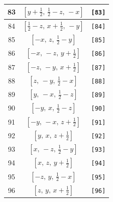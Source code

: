 \documentclass[fleqn,8pt]{jsarticle}
\begin{document}
\begin{longtable}{ccc}
83 & $\left[ y + \frac{1}{2},\, \frac{1}{2} - z,\, - x \right]$ & {\tt [83]} \\ \hline
84 & $\left[ \frac{1}{2} - z,\, x + \frac{1}{2},\, - y \right]$ & {\tt [84]} \\ \hline
85 & $\left[ - x,\, z,\, \frac{1}{2} - y \right]$ & {\tt [85]} \\ \hline
86 & $\left[ - x,\, - z,\, y + \frac{1}{2} \right]$ & {\tt [86]} \\ \hline
87 & $\left[ - z,\, - y,\, x + \frac{1}{2} \right]$ & {\tt [87]} \\ \hline
88 & $\left[ z,\, - y,\, \frac{1}{2} - x \right]$ & {\tt [88]} \\ \hline
89 & $\left[ y,\, - x,\, \frac{1}{2} - z \right]$ & {\tt [89]} \\ \hline
90 & $\left[ - y,\, x,\, \frac{1}{2} - z \right]$ & {\tt [90]} \\ \hline
91 & $\left[ - y,\, - x,\, z + \frac{1}{2} \right]$ & {\tt [91]} \\ \hline
92 & $\left[ y,\, x,\, z + \frac{1}{2} \right]$ & {\tt [92]} \\ \hline
93 & $\left[ x,\, - z,\, \frac{1}{2} - y \right]$ & {\tt [93]} \\ \hline
94 & $\left[ x,\, z,\, y + \frac{1}{2} \right]$ & {\tt [94]} \\ \hline
95 & $\left[ - z,\, y,\, \frac{1}{2} - x \right]$ & {\tt [95]} \\ \hline
96 & $\left[ z,\, y,\, x + \frac{1}{2} \right]$ & {\tt [96]} \\
\end{longtable}
\end{document}
